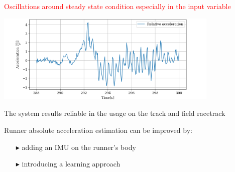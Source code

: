 \documentclass[9pt, aspectratio=169]{beamer}
\begin{document}
\begin{frame}
\begin{columns}
\begin{column}{0.6\textwidth}
\vspace{-0.4cm}
\begin{block}{}
\centering
\textcolor{red}{Oscillations around steady state condition especially in the input variable}
\end{block}
\vspace{0.2cm}
	\begin{center}
  		\includegraphics[width=0.8\textwidth]{Hardware_test/Acceleration} 
	\end{center}

The system results reliable in the usage on the track and field racetrack

\vspace{0.1cm}
\begin{block}{}
Runner absolute acceleration estimation can be improved by:
\begin{itemize}
	\footnotesize
	\item[$\blacktriangleright$] adding an IMU on the runner's body 
	\item[$\blacktriangleright$] introducing a learning approach
\end{itemize}
\end{block}

\end{column}
\end{columns}

\end{frame}
\end{document}
